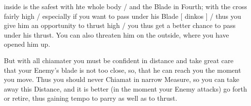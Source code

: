 \newpage


\newpage



inside is the safest with hte whole body / and the Blade in Fourth;
with the cross fairly high / especially if you want to pass under his
Blade [ dinkos ] / thus you give him an
opportunity to thrust high / you thus get a better chance to pass
under his thrust. You can also threaten him on the outside, where you
have opened him up.


But with all chiamater you must be confident in distance and take great
care that your Enemy's blade is not too close, so,  that he can reach you
the moment you move. Thus you should never Chiamat in narrow Measure, so
you can take away this Distance, and it is better (in the moment your
Enemy attacks) go forth or retire, thus gaining tempo to parry as well
as to thrust.


